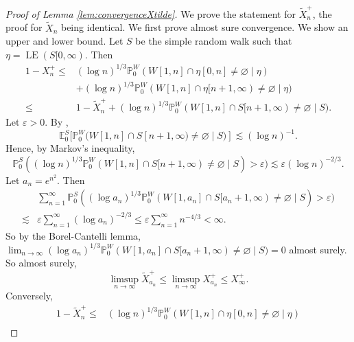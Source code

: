 \documentclass{article}
\DeclareMathOperator{\LE}{LE}
\renewcommand{\P}{\mathbb{P}}
\newcommand{\E}{\mathbb{E}}
\newcommand{\1}{\mathbf{1}}
\newcommand{\limn}{\lim_{n\rightarrow\infty}}
\theoremstyle{definition}
\numberwithin{equation}{section}
\numberwithin{theorem}{section}
\begin{document}
\begin{proof}[Proof of Lemma \ref{lem:convergenceXtilde}]
We prove the statement for $\widetilde{X}^+_n$, the proof for $\widetilde{X}_n$ being identical. We first prove almost sure convergence. We show an upper and lower bound. 
Let $S$ be the simple random walk such that $\eta=\LE(S[0,\infty)$. Then
\begin{equation}
    \begin{split}
        1-X^+_n\leq&(\log n)^{1/3}\P^W_0(W[1,n]\cap\eta[0,n]\neq\varnothing\mid\eta)\\
        &+(\log n)^{1/3}\P^W_0(W[1,n]\cap\eta[n+1,\infty)\neq\varnothing\mid\eta)\\
        \leq&1-\widetilde{X}^+_n+(\log n)^{1/3}\P_0^W(W[1,n]\cap S[n+1,\infty)\neq\varnothing\mid S).
    \end{split}
\end{equation}
Let $\varepsilon>0$. By \cite[Theorem 4.3.6]{lawler91intersections}, 
\begin{equation}
	\E^S_0[\P^W_0(W[1,n]\cap S[n+1,\infty)\neq\varnothing\mid S)]\lesssim(\log n)^{-1}.
\end{equation}
Hence, by Markov's inequality,
\begin{equation}
	\P^S_0((\log n)^{1/3}\P^W_0(W[1,n]\cap S[n+1,\infty)\neq\varnothing\mid S)>\varepsilon)\lesssim\varepsilon(\log n)^{-2/3}.
\end{equation}
Let $a_n=e^{n^2}$. Then
\begin{equation}
    \begin{split}
        &\sum_{n=1}^{\infty}\P^S_0((\log a_n)^{1/3}\P^W_0(W[1,a_n]\cap S[a_n+1,\infty)\neq\varnothing\mid S)>\varepsilon)\\
        \lesssim&\varepsilon\sum_{n=1}^\infty(\log a_n)^{-2/3}\leq\varepsilon\sum_{n=1}^\infty n^{-4/3}<\infty.
    \end{split}
\end{equation}
So by the Borel-Cantelli lemma, $\limn(\log a_n)^{1/3}\P^W_0(W[1,a_n]\cap S[a_n+1,\infty)\neq\varnothing\mid S)=0$ almost surely. So almost surely,
\begin{equation}
\limsup_{n\rightarrow\infty}\widetilde{X}_{a_n}^+\leq\limsup_{n\rightarrow\infty}X_{a_n}^+\leq X_\infty^+.
\end{equation}
Conversely,
\begin{equation}
    \begin{split}
        1-\widetilde{X}^+_n\leq&(\log n)^{1/3}\P_0^W(W[1,n]\cap\eta[0,n]\neq\varnothing\mid\eta)\\

\end{split}
\end{equation}
\end{proof}
\end{document}
